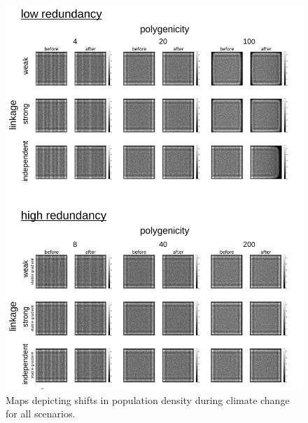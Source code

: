 \documentclass[9pt,twocolumn,twoside,lineno]{pnas-new}
\begin{document}
\begin{figure}
\centering
\includegraphics[width=.8\linewidth]{pub/figs_and_stats/FIG_S4_density_shift.jpg}
\caption{Maps depicting shifts in population density during climate change for all scenarios.}
\label{fig:fig_s4}
\end{figure}


\end{document}
